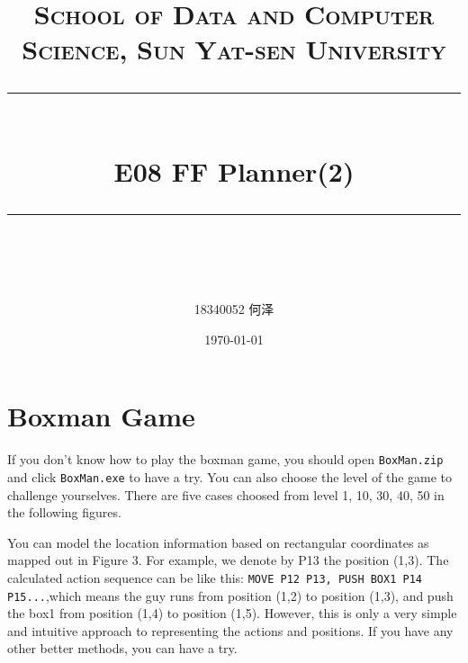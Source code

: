 \documentclass[a4paper, 11pt]{article}
\title{	
\normalfont \normalsize
\textsc{School of Data and Computer Science, Sun Yat-sen University} \\ [25pt] %
\rule{\textwidth}{0.5pt} \\[0.4cm] %
\huge  E08 FF Planner(2)\\ %
\rule{\textwidth}{2pt} \\[0.5cm] %
\author{18340052            何泽}
\date{\normalsize\today}
}
\begin{document}
\maketitle
\tableofcontents
\newpage

\section{Boxman Game}
If you don't know how to play the boxman game, you should open \texttt{BoxMan.zip} and click \texttt{BoxMan.exe} to have a try.  You can also choose the level of the game to challenge yourselves. There are five cases choosed from level 1, 10, 30, 40, 50 in the following figures.

You can model the location information based on rectangular coordinates as mapped out in Figure 3. For example, we denote by P13 the position (1,3). The calculated action sequence can be like this: \texttt{MOVE P12 P13, PUSH BOX1 P14 P15...},which means the guy runs from position (1,2) to position (1,3), and push the box1 from position (1,4) to position (1,5). However, this is only a very simple and intuitive approach to representing the actions and positions. If you have any other better methods, you can have a try.
\end{document}

